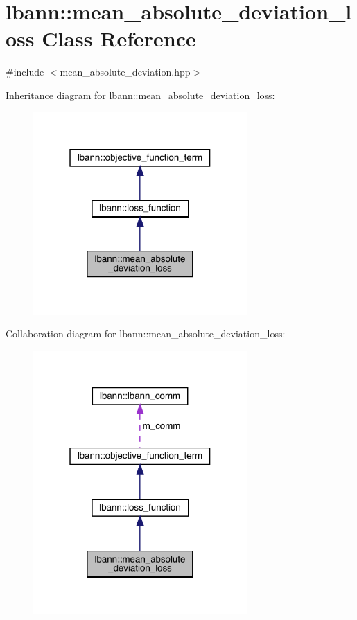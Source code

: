 \hypertarget{classlbann_1_1mean__absolute__deviation__loss}{}\section{lbann\+:\+:mean\+\_\+absolute\+\_\+deviation\+\_\+loss Class Reference}
\label{classlbann_1_1mean__absolute__deviation__loss}


{\ttfamily \#include $<$mean\+\_\+absolute\+\_\+deviation.\+hpp$>$}



Inheritance diagram for lbann\+:\+:mean\+\_\+absolute\+\_\+deviation\+\_\+loss\+:\nopagebreak
\begin{figure}[H]
\begin{center}
\leavevmode
\includegraphics[width=232pt]{classlbann_1_1mean__absolute__deviation__loss__inherit__graph}
\end{center}
\end{figure}


Collaboration diagram for lbann\+:\+:mean\+\_\+absolute\+\_\+deviation\+\_\+loss\+:\nopagebreak
\begin{figure}[H]
\begin{center}
\leavevmode
\includegraphics[width=232pt]{classlbann_1_1mean__absolute__deviation__loss__coll__graph}
\end{center}
\end{figure}
